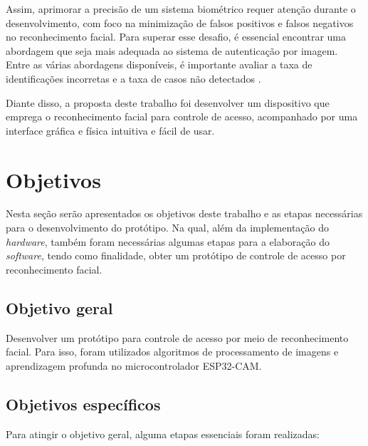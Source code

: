 Assim, aprimorar a precisão de um sistema biométrico requer atenção 
durante o desenvolvimento, com foco na minimização de falsos 
positivos e falsos negativos no reconhecimento facial. Para superar esse 
desafio, é essencial encontrar uma abordagem que seja mais adequada ao 
sistema de autenticação por imagem. Entre as várias abordagens disponíveis, 
é importante avaliar a taxa de identificações incorretas e a taxa de 
casos não detectados \cite[p. 8]{viola2004}.


Diante disso, a proposta deste trabalho foi desenvolver um dispositivo que emprega 
o reconhecimento facial para controle de acesso, acompanhado por 
uma interface gráfica e física intuitiva e fácil de usar.

\section{Objetivos}\label{sec:objetivos}

Nesta seção serão apresentados os objetivos deste trabalho e as etapas necessárias 
para o desenvolvimento do protótipo. Na qual, além da implementação do 
\textit{hardware}, também foram necessárias algumas etapas para a elaboração do \textit{software}, 
tendo como finalidade, obter um protótipo de controle de acesso por 
reconhecimento facial.

\subsection{Objetivo geral}\label{subsec:objetivoGeral}

Desenvolver um protótipo para controle de acesso por meio de reconhecimento facial. 
Para isso, foram utilizados algoritmos de processamento de imagens e aprendizagem 
profunda no microcontrolador ESP32-CAM.

\subsection{Objetivos específicos}\label{subsec:objetivosEspecificos}

Para atingir o objetivo geral, alguma etapas essenciais foram realizadas:

